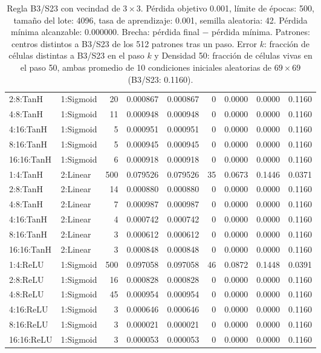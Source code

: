 \begin{table}[H]
\begin{tabular}{llrrrrrrr}
		2:8:TanH & 1:Sigmoid & 20 & 0.000867 & 0.000867 & 0 & 0.0000 & 0.0000 & 0.1160 \\
		4:8:TanH & 1:Sigmoid & 11 & 0.000948 & 0.000948 & 0 & 0.0000 & 0.0000 & 0.1160 \\
		4:16:TanH & 1:Sigmoid & 5 & 0.000951 & 0.000951 & 0 & 0.0000 & 0.0000 & 0.1160 \\
		8:16:TanH & 1:Sigmoid & 5 & 0.000945 & 0.000945 & 0 & 0.0000 & 0.0000 & 0.1160 \\
		16:16:TanH & 1:Sigmoid & 6 & 0.000918 & 0.000918 & 0 & 0.0000 & 0.0000 & 0.1160 \\
		\midrule
		1:4:TanH & 2:Linear & 500 & 0.079526 & 0.079526 & 35 & 0.0673 & 0.1446 & 0.0371 \\
		2:8:TanH & 2:Linear & 14 & 0.000880 & 0.000880 & 0 & 0.0000 & 0.0000 & 0.1160 \\
		4:8:TanH & 2:Linear & 7 & 0.000987 & 0.000987 & 0 & 0.0000 & 0.0000 & 0.1160 \\
		4:16:TanH & 2:Linear & 4 & 0.000742 & 0.000742 & 0 & 0.0000 & 0.0000 & 0.1160 \\
		8:16:TanH & 2:Linear & 3 & 0.000612 & 0.000612 & 0 & 0.0000 & 0.0000 & 0.1160 \\
		16:16:TanH & 2:Linear & 3 & 0.000848 & 0.000848 & 0 & 0.0000 & 0.0000 & 0.1160 \\
		\midrule
		1:4:ReLU & 1:Sigmoid & 500 & 0.097058 & 0.097058 & 46 & 0.0872 & 0.1448 & 0.0391 \\
		2:8:ReLU & 1:Sigmoid & 16 & 0.000828 & 0.000828 & 0 & 0.0000 & 0.0000 & 0.1160 \\
		4:8:ReLU & 1:Sigmoid & 45 & 0.000954 & 0.000954 & 0 & 0.0000 & 0.0000 & 0.1160 \\
		4:16:ReLU & 1:Sigmoid & 3 & 0.000646 & 0.000646 & 0 & 0.0000 & 0.0000 & 0.1160 \\
		8:16:ReLU & 1:Sigmoid & 3 & 0.000021 & 0.000021 & 0 & 0.0000 & 0.0000 & 0.1160 \\
		16:16:ReLU & 1:Sigmoid & 3 & 0.000053 & 0.000053 & 0 & 0.0000 & 0.0000 & 0.1160 \\
		\bottomrule
	\end{tabular}
	\caption{Regla B3/S23 con vecindad de $3\times3$. Pérdida objetivo 0.001, límite de épocas: 500, tamaño del lote: 4096, tasa de aprendizaje: 0.001, semilla aleatoria: 42. Pérdida mínima alcanzable: 0.000000. Brecha: pérdida final $-$ pérdida mínima. Patrones: centros distintos a B3/S23 de los 512 patrones tras un paso. Error $k$: fracción de células distintas a B3/S23 en el paso $k$ y Densidad 50: fracción de células vivas en el paso 50, ambas promedio de 10 condiciones iniciales aleatorias de $69\times69$ (B3/S23: 0.1160).}
	\label{tab:vecindad_3x3}
\end{table}
